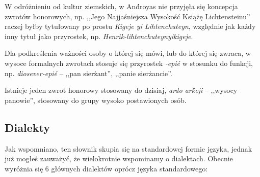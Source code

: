 \begin{spacing}{1.1}
W odróżnieniu od kultur ziemskich, w And́royas nie przyjęła się koncepcja
zwrotów honorowych, np. ,,Jego Najjaśniejsza Wysokość Książę Lichtensteinu''
raczej byłby tytułowany po prostu \emph{Kigeje yi Lihtenchuteyn}, względnie jak
każdy inny tytuł jako przyrostek, np. \emph{Henrik-lihtenchuteynyikigeje}.

Dla podkreślenia ważności osoby o której się mówi, lub do której się zwraca, w
wysoce formalnych zwrotach stosuje się przyrostek \emph{-epié} w stosunku do
funkcji, np. \emph{diosever-epié} -- ,,pan sierżant'', ,,panie sierżancie''.


Istnieje jeden zwrot honorowy stosowany do dzisiaj, \emph{ardo arḱeji} --
,,wysocy panowie'', stosowany do grupy wysoko postawionych osób.

\subsection{Dialekty}
Jak wspomniano, ten słownik skupia się na standardowej formie języka, jednak już
mogłeś zauważyć, że wielokrotnie wspominamy o dialektach. Obecnie wyróżnia się 6
głównych dialektów oprócz języka standardowego:


\end{spacing}
